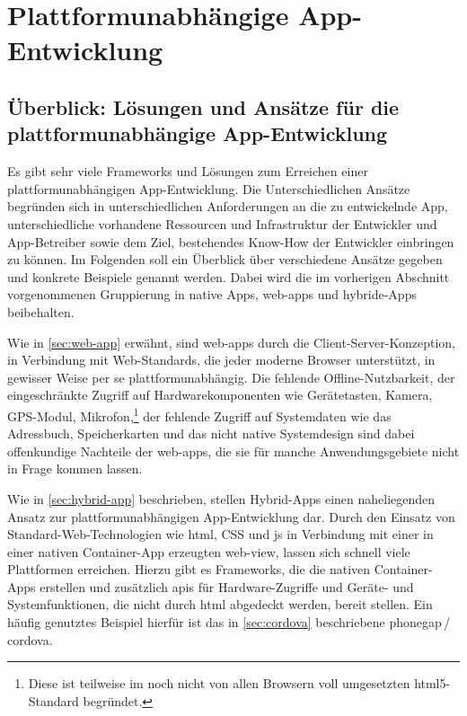 \chapter{Plattformunabhängige App-Entwicklung}

\section[Überblick: Lösungen und Ansätze]{Überblick: Lösungen und Ansätze für die platt\-form\-un\-ab\-hängige App-Entwicklung} \label{sec:overview}

Es gibt sehr viele Frameworks und Lösungen zum Erreichen einer plattformunabhängigen App-Entwicklung. Die Unterschiedlichen Ansätze begründen sich in unterschiedlichen Anforderungen an die zu entwickelnde App, unterschiedliche vorhandene Ressourcen und Infrastruktur der Entwickler und App-Betreiber sowie dem Ziel, bestehendes Know-How der Entwickler einbringen zu können.
Im Folgenden soll ein Überblick über verschiedene Ansätze gegeben und konkrete Beispiele genannt werden. Dabei wird die im vorherigen Abschnitt vorgenommenen Gruppierung in native Apps, \glspl{web-app} und hybride-Apps beibehalten.

Wie in \autoref{sec:web-app} erwähnt, sind \glspl{web-app} durch die Client-Server-Konzeption, in Verbindung mit Web-Standards, die jeder moderne Browser unterstützt, in gewisser Weise per se plattformunabhängig. Die fehlende Offline-Nutzbarkeit, der eingeschränkte Zugriff auf Hardwarekomponenten wie Gerätetasten, Kamera, GPS-Modul, Mikrofon,\footnote{Diese ist teilweise im noch nicht von allen Browsern voll umgesetzten \gls{html5}-Standard begründet.} der fehlende Zugriff auf Systemdaten wie das Adressbuch, Speicherkarten und das nicht native Systemdesign sind dabei offenkundige Nachteile der \glspl{web-app}, die sie für manche Anwendungsgebiete nicht in Frage kommen lassen.

Wie in \autoref{sec:hybrid-app} beschrieben, stellen Hybrid-Apps einen naheliegenden Ansatz zur plattformunabhängigen App-Entwicklung dar. Durch den Einsatz von Standard-Web-Technologien wie \gls{html}, CSS und \gls{js} in Verbindung mit einer in einer nativen Container-App erzeugten \gls{web-view}, lassen sich schnell viele Plattformen erreichen. Hierzu gibt es Frameworks, die die nativen Container-Apps erstellen und zusätzlich \glspl{api} für Hardware-Zugriffe und Geräte- und Systemfunktionen, die nicht durch \gls{html} abgedeckt werden, bereit stellen. Ein häufig genutztes Beispiel hierfür ist das in \autoref{sec:cordova} beschriebene \gls{phonegap}\,/\,\gls{cordova}.

